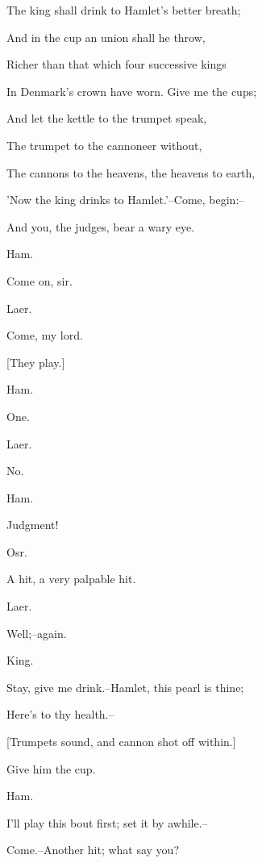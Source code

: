 \documentclass[12pt]{book}
\begin{document}
The king shall drink to Hamlet's better breath;

And in the cup an union shall he throw,

Richer than that which four successive kings

In Denmark's crown have worn. Give me the cups;

And let the kettle to the trumpet speak,

The trumpet to the cannoneer without,

The cannons to the heavens, the heavens to earth,

'Now the king drinks to Hamlet.'--Come, begin:--

And you, the judges, bear a wary eye.



Ham.

Come on, sir.



Laer.

Come, my lord.



[They play.]



Ham.

One.



Laer.

No.



Ham.

Judgment!



Osr.

A hit, a very palpable hit.



Laer.

Well;--again.



King.

Stay, give me drink.--Hamlet, this pearl is thine;

Here's to thy health.--



[Trumpets sound, and cannon shot off within.]



Give him the cup.



Ham.

I'll play this bout first; set it by awhile.--

Come.--Another hit; what say you?
\end{document}
